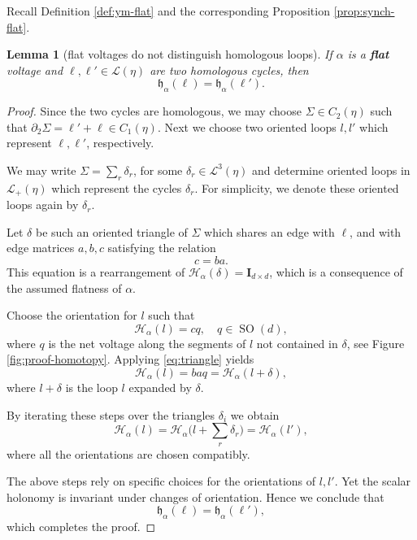 \documentclass[10pt,reqno]{amsart}
\numberwithin{equation}{section}
\theoremstyle{bfnote}
\newtheorem{lemma}[theorem]{Lemma}
\theoremstyle{bfdef}
\newcommand{\mc}[1]{\mathcal{#1}}
\newcommand{\II}{\mathbf{I}_{d \times d}}
\DeclareMathOperator{\SO}{SO}
\providecommand\a; %
\renewcommand{\a}{\alpha}
\providecommand\ccs; %
\renewcommand{\ccs}{voltages }
\providecommand\Hol; %
\renewcommand{\Hol}{\mc{H}}
\providecommand\Lps; %
\renewcommand{\Lps}{\mc{L}}
\providecommand\hol; %
\renewcommand{\hol}{\mathfrak{h}}
\begin{document}
Recall Definition \ref{def:ym-flat} and the corresponding Proposition \ref{prop:synch-flat}.

		\begin{lemma}[flat \ccs do not distinguish homologous loops]\label{lem:scalar-hol-homologous}
			If $\a$ is a \textbf{flat} voltage and $\ell,\ell' \in \Lps(\eta)$ are two homologous cycles, then
			\begin{equation}
				\hol_{\a}(\ell) = \hol_{\a}(\ell').
			\end{equation}
		\end{lemma}

		\begin{proof}
			\newcommand\xx\Sigma%
			\newcommand\yy\Sigma%
				Since the two cycles are homologous, we may choose $\yy \in C_2(\eta)$  such that $\partial_2 \yy = \ell' + \ell \in C_1(\eta)$.
				Next we choose two oriented loops $l,l'$ which represent $\ell,\ell'$, respectively.

				We may write $\yy = \sum_{r} \delta_r$, for some $\delta_r \in \Lps^3(\eta)$  and determine
				 oriented loops in $\Lps_{+}(\eta)$ which represent the cycles $\delta_r$. For simplicity,  we denote these oriented loops again by $\delta_r$.

				Let $\delta$ be such an oriented triangle of $\yy$ which shares an edge with $\ell$, and with edge matrices $a,b,c$ satisfying the relation
				\begin{equation}\label{eq:triangle}
					c = b a.
				\end{equation}
				This equation is a rearrangement of $\Hol_{\a}(\delta)=\II$, which is a consequence of the assumed flatness of $\a$.

				Choose the orientation for $l$ such that
				\begin{equation}
					\Hol_{\a}(l) = c q, \quad q \in \SO(d),
				\end{equation}
				where $q$ is the net voltage along the segments of $l$ not contained in $\delta$, see Figure \ref{fig:proof-homotopy}. Applying \eqref{eq:triangle} yields
				\begin{equation}
					\Hol_{\a}(l) = b a q = \Hol_{\a}(l + \delta),
				\end{equation}
				where $l + \delta$ is the loop $l$ expanded by $\delta$.

			By iterating these steps over the triangles $\delta_i$ we obtain
			\begin{equation}
				\Hol_{\a}(l) = \Hol_{\a}\Big(l + \sum_{r} \delta_r \Big) = \Hol_{\a}(l'),
			\end{equation}
			where all the orientations are chosen compatibly.

			The above steps rely on specific choices for the orientations of $l,l'$. Yet the scalar holonomy is invariant under changes of orientation. Hence we conclude that
			\begin{equation}
				\hol_{\a}(\ell) = \hol_{\a}(\ell'),
			\end{equation}
			which completes the proof.
		\end{proof}
\end{document}
